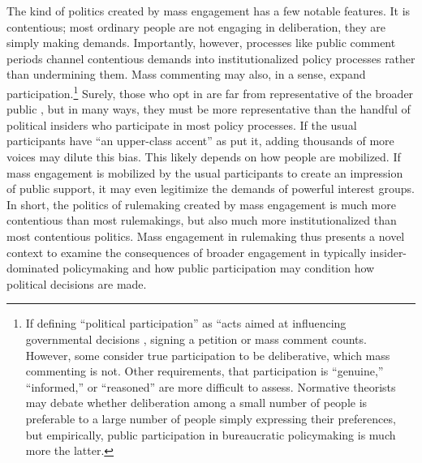 The kind of politics created by mass engagement has a few notable features. It is contentious; most ordinary people are not engaging in deliberation, they are simply making demands. Importantly, however, processes like public comment periods channel contentious demands into institutionalized policy processes rather than undermining them. %
Mass commenting may also, in a sense, expand participation.\footnote{
If defining ``political participation'' as ``acts aimed at influencing governmental decisions \citep[p. 2]{Verba1987}, signing a petition or mass comment counts. However, some consider true participation to be deliberative, which mass commenting is not. Other requirements, that participation is ``genuine,'' ``informed,'' or ``reasoned'' are more difficult to assess. %
Normative theorists may debate whether deliberation among a small number of people is preferable to a large number of people simply expressing their preferences, but empirically, public participation in bureaucratic policymaking is much more the latter.
} 
Surely, those who opt in are far from representative of the broader public \citep{Verba1987}, but in many ways, they must be more representative than the handful of political insiders who participate in most policy processes. If the usual participants have ``an upper-class accent'' as \citet{Schattschneider1942} put it, adding thousands of more voices may dilute this bias. This likely depends on how people are mobilized. If mass engagement is mobilized by the usual participants to create an impression of public support, it may even legitimize the demands of powerful interest groups. In short, the politics of rulemaking created by mass engagement is much more contentious than most rulemakings, but also much more institutionalized than most contentious politics. Mass engagement in rulemaking thus presents a novel context to examine the consequences of broader engagement in typically insider-dominated policymaking and how public participation may condition how political decisions are made. 











